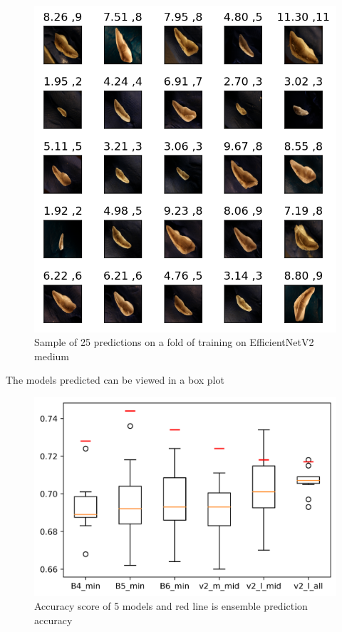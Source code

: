 \documentclass[10pt,letterpaper]{article}
\begin{document}
\begin{figure}[h!]
  \centering
  \begin{minipage}[b]{0.49\textwidth}
  \includegraphics[scale=0.5]{results/fold_prediction_V2_m.png}
    \caption{Sample of 25 predictions on a fold of training on EfficientNetV2 medium}
   \label{marker5}
  \end{minipage}
  \hfill
\end{figure}

The models predicted can be viewed in a box plot

\begin{figure}[h!]
  \centering
  \begin{minipage}[b]{0.49\textwidth}
  \includegraphics[scale=0.2]{results/box_plot_models_acc.png}
    \caption{Accuracy score of 5 models and red line is ensemble prediction accuracy}
   \label{marker5}
  \end{minipage}
  \hfill
\end{figure}
\end{document}
